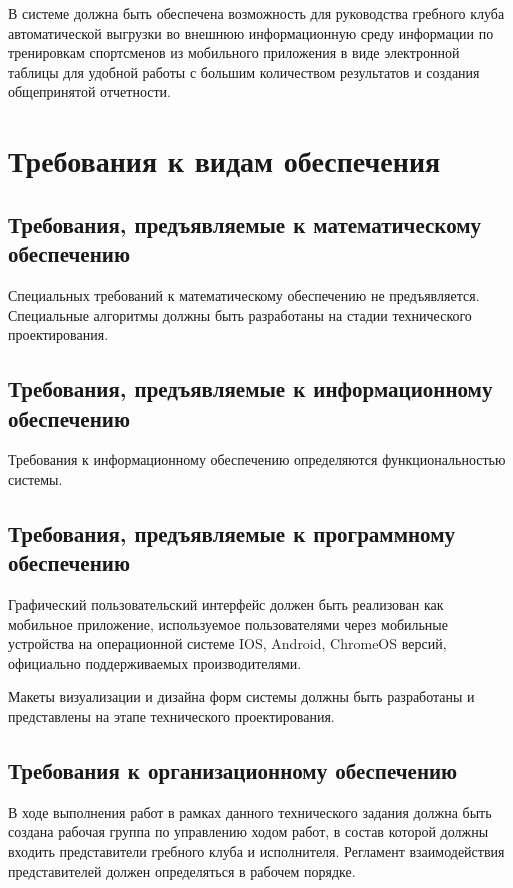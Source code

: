 \documentclass[14pt]{extreport}
\begin{document}
В системе должна быть обеспечена возможность для руководства гребного клуба автоматической
выгрузки во внешнюю информационную среду информации по тренировкам спортсменов из мобильного приложения в виде электронной таблицы для удобной работы с большим количеством результатов и создания общепринятой отчетности.

\section{Требования к видам обеспечения}

\subsection{Требования, предъявляемые к математическому обеспечению}

Специальных требований к математическому обеспечению не
предъявляется. Специальные алгоритмы должны быть разработаны на стадии
технического проектирования.

\subsection{Требования, предъявляемые к информационному обеспечению}

Требования к информационному обеспечению определяются
функциональностью системы.

\subsection{Требования, предъявляемые к программному обеспечению}

Графический пользовательский интерфейс должен быть реализован как
мобильное приложение, используемое пользователями через мобильные устройства на операционной системе IOS, Android, ChromeOS версий, официально поддерживаемых производителями.

Макеты визуализации и дизайна форм системы должны быть разработаны и
представлены на этапе технического проектирования.

\subsection{Требования к организационному обеспечению}

В ходе выполнения работ в рамках данного технического задания должна
быть создана рабочая группа по управлению ходом работ, в состав которой
должны входить представители гребного клуба и исполнителя. Регламент взаимодействия представителей должен определяться в рабочем порядке.
\end{document}
